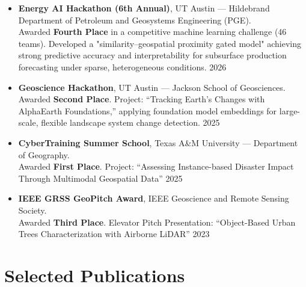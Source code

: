 \documentclass[a4paper,12pt]{article}
\begin{document}
\begin{itemize}[leftmargin=1.5em, itemsep=4pt, label=--]

    \item \textbf{Energy AI Hackathon (6th Annual)}, UT Austin — Hildebrand Department of Petroleum and Geosystems Engineering (PGE). \\
    Awarded \textbf{Fourth Place} in a competitive machine learning challenge (46 teams). 
    Developed a "similarity–geospatial proximity gated model" achieving strong predictive accuracy and interpretability for subsurface production forecasting under sparse, heterogeneous conditions. \hfill 2026

    \item \textbf{Geoscience Hackathon}, UT Austin — Jackson School of Geosciences. \\
    Awarded \textbf{Second Place}. Project: ``Tracking Earth's Changes with AlphaEarth Foundations,'' applying foundation model embeddings for large-scale, flexible landscape system change detection. \hfill 2025

    \item \textbf{CyberTraining Summer School}, Texas A\&M University — Department of Geography. \\
    Awarded \textbf{First Place}. Project: ``Assessing Instance-based Disaster Impact Through Multimodal Geospatial Data''  \hfill 2025

    \item \textbf{IEEE GRSS GeoPitch Award}, IEEE Geoscience and Remote Sensing Society. \\
    Awarded \textbf{Third Place}. Elevator Pitch Presentation: ``Object-Based Urban Trees Characterization with Airborne LiDAR'' \hfill 2023

\end{itemize}


\section{Selected Publications}
\end{document}

